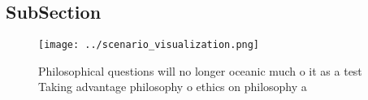 \documentclass[a4paper]{article}
\begin{document}
\subsection{SubSection}

\begin{figure}
\centering
\texttt{[image: ../scenario\_visualization.png]}
\caption{Philosophical questions will no longer oceanic much o it as a test Taking advantage philosophy o ethics on philosophy a
}
\end{figure}
 
\end{document}
